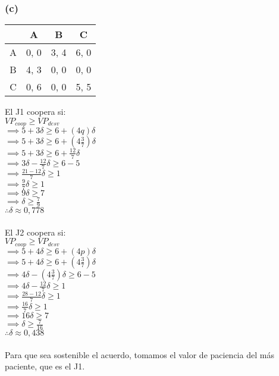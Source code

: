 \documentclass{article}
\begin{document}
            \subsubsection*{(c)}
                \begin{table}[H]
                    \begin{tabular}{|c|c|c|c|}
                        \hline
                                & A & B & C \\ \hline
                            A & 0, 0 & 3, 4 & 6, 0 \\ 
                            B & 4, 3 & 0, 0 & 0, 0 \\
                            C & 0, 6 & 0, 0 & 5, 5 \\ \hline
                    \end{tabular}
                \end{table}
                El J1 coopera si: \\
                \(VP_{coop} \geq VP_{desv}\) \\
                \(\implies 5 + 3\delta \geq 6 + (4q)\delta\) \\
                \(\implies 5 + 3\delta \geq 6 + (4\frac{3}{7})\delta\) \\
                \(\implies 5 + 3\delta \geq 6 + \frac{12}{7}\delta\) \\
                \(\implies 3\delta - \frac{12}{7}\delta \geq 6 - 5\) \\
                \(\implies \frac{21-12}{7}\delta \geq 1\) \\
                \(\implies \frac{9}{7}\delta \geq 1\) \\
                \(\implies 9\delta \geq 7\) \\
                \(\implies \delta \geq \frac{7}{9}\) \\
                \(\therefore \delta \approx 0,778\) \\
                \\
                El J2 coopera si: \\
                \(VP_{coop} \geq VP_{desv}\) \\
                \(\implies 5 + 4\delta \geq 6 + (4p)\delta\) \\
                \(\implies 5 + 4\delta \geq 6 + (4\frac{3}{7})\delta\) \\
                \(\implies 4\delta - (4\frac{3}{7})\delta \geq 6 - 5\) \\
                \(\implies 4\delta - \frac{12}{7}\delta \geq 1\) \\
                \(\implies \frac{28-12}{7}\delta \geq 1\) \\
                \(\implies \frac{16}{7}\delta \geq 1\) \\
                \(\implies 16\delta \geq 7\) \\
                \(\implies \delta \geq \frac{7}{16}\) \\
                \(\therefore \delta \approx 0,438\) \\
                \\
                Para que sea sostenible el acuerdo, tomamos el valor de paciencia del más paciente, que es el J1.
\end{document}
